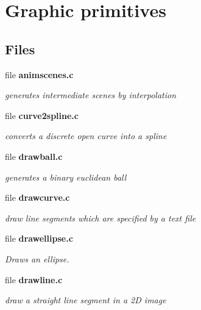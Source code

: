 \section{Graphic primitives}
\label{group__draw}
\subsection*{Files}
\begin{CompactItemize}
\item 
file {\bf animscenes.c}
\begin{CompactList}\small\item\em generates intermediate scenes by interpolation \item\end{CompactList}

\item 
file {\bf curve2spline.c}
\begin{CompactList}\small\item\em converts a discrete open curve into a spline \item\end{CompactList}

\item 
file {\bf drawball.c}
\begin{CompactList}\small\item\em generates a binary euclidean ball \item\end{CompactList}

\item 
file {\bf drawcurve.c}
\begin{CompactList}\small\item\em draw line segments which are specified by a text file \item\end{CompactList}

\item 
file {\bf drawellipse.c}
\begin{CompactList}\small\item\em Draws an ellipse. \item\end{CompactList}

\item 
file {\bf drawline.c}
\begin{CompactList}\small\item\em draw a straight line segment in a 2D image \item\end{CompactList}


\end{CompactItemize}
